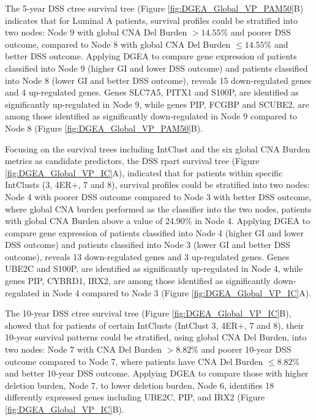 The 5-year DSS ctree survival tree (Figure \ref{fig:DGEA_Global_VP_PAM50}B) indicates that for Luminal A patients, survival profiles could be stratified into two nodes: Node 9 with global CNA Del Burden $> 14.55\%$ and poorer DSS outcome, compared to Node 8 with global CNA Del Burden $\leq 14.55\%$ and better DSS outcome. Applying DGEA to compare gene expression of patients classified into Node 9 (higher GI and lower DSS outcome) and patients classified into Node 8 (lower GI and better DSS outcome), reveals 15 down-regulated genes and 4 up-regulated genes. Genes SLC7A5, PITX1 and S100P, are identified as significantly up-regulated in Node 9, while genes PIP, FCGBP and SCUBE2, are among those identified as significantly down-regulated in Node 9 compared to Node 8 (Figure \ref{fig:DGEA_Global_VP_PAM50}B). 

Focusing on the survival trees including IntClust and the six global CNA Burden metrics as candidate predictors, the DSS rpart survival tree (Figure \ref{fig:DGEA_Global_VP_IC}A), indicated that for patients within specific IntClusts (3, 4ER+, 7 and 8), survival profiles could be stratified into two nodes: Node 4 with poorer DSS outcome compared to Node 3 with better DSS outcome, where global CNA burden performed as the classifier into the two nodes, patients with global CNA Burden above a value of 24.90\% in Node 4. Applying DGEA to compare gene expression of patients classified into Node 4 (higher GI and lower DSS outcome) and patients classified into Node 3 (lower GI and better DSS outcome), reveals 13 down-regulated genes and 3 up-regulated genes. Genes UBE2C and S100P, are identified as significantly up-regulated in Node 4, while genes PIP, CYBRD1, IRX2, are among those identified as significantly down-regulated in Node 4 compared to Node 3 (Figure \ref{fig:DGEA_Global_VP_IC}A). 

The 10-year DSS ctree survival tree (Figure \ref{fig:DGEA_Global_VP_IC}B), showed that for patients of certain IntClusts (IntClust 3, 4ER+, 7 and 8), their 10-year survival patterns could be stratified, using global CNA Del Burden, into two nodes: Node 7 with CNA Del Burden $>8.82\%$ and poorer 10-year DSS outcome compared to Node 7, where patients have CNA Del Burden $\leq8.82\%$ and better 10-year DSS outcome. Applying DGEA to compare those with higher deletion burden, Node 7, to lower deletion burden, Node 6, identifies 18 differently expressed genes including UBE2C, PIP, and IRX2 (Figure \ref{fig:DGEA_Global_VP_IC}B).


